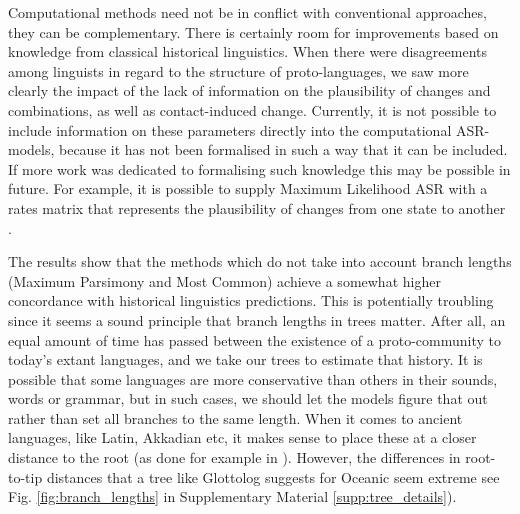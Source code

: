 \documentclass[12pt,letterpaper]{article}
\begin{document}
Computational methods need not be in conflict with conventional approaches, they can be complementary. There is certainly room for improvements based on knowledge from classical historical linguistics. When there were disagreements among linguists in regard to the structure of proto-languages, we saw more clearly the impact of the lack of information on the plausibility of changes and combinations, as well as contact-induced change. Currently, it is not possible to include information on these parameters directly into the computational ASR-models, because it has not been formalised in such a way that it can be included. If more work was dedicated to formalising such knowledge this may be possible in future. For example, it is possible to supply Maximum Likelihood ASR with a rates matrix that represents the plausibility of changes from one state to another \citep[8-9]{R-corHMM}.




The results show that the methods which do not take into account branch lengths (Maximum Parsimony and Most Common) achieve a somewhat higher concordance with historical linguistics predictions. This is potentially troubling since it seems a sound principle that branch lengths in trees matter. After all, an equal amount of time has passed between the existence of a proto-community to today's extant languages, and we take our trees to estimate that history. It is possible that some languages are more conservative than others in their sounds, words or grammar, but in such cases, we should let the models figure that out rather than set all branches to the same length. When it comes to ancient languages, like Latin, Akkadian etc, it makes sense to place these at a closer distance to the root (as done for example in \citet{carling2021reconstructing}). However, the differences in root-to-tip distances that a tree like Glottolog suggests for Oceanic seem extreme see Fig. \ref{fig:branch_lengths} in Supplementary Material \ref{supp:tree_details}). 
\end{document}
